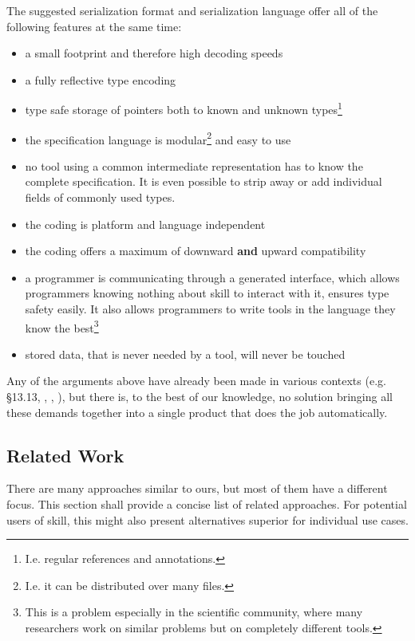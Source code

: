 The suggested serialization format and serialization language offer all of the following features at the same time:
\begin{itemize}
 \item a small footprint and therefore high decoding speeds
 \item a fully reflective type encoding
 \item type safe storage of pointers both to known and unknown types\footnote{I.e. regular references and annotations.}
 \item the specification language is modular\footnote{I.e. it can be distributed over many files.} and easy to use
 \item no tool using a common intermediate representation has to know the complete specification. It is even possible to strip away or add individual fields of commonly used types.
 \item the coding is platform and language independent
 \item the coding offers a maximum of downward \textbf{and} upward compatibility
 \item a programmer is communicating through a generated interface, which allows programmers knowing nothing about skill to interact with it, ensures type safety easily. It also allows programmers to write tools in the language they know the best\footnote{This is a problem especially in the scientific community, where many researchers work on similar problems but on completely different tools.}
 \item stored data, that is never needed by a tool, will never be touched
\end{itemize}

Any of the arguments above have already been made in various contexts (e.g. \cite{ada05} §13.13, \cite{llvm}, \cite{xml11}, \cite{lamb87}), but there is, to the best of our knowledge, no solution bringing all these demands together into a single product that does the job automatically.


\subsection{Related Work}

There are many approaches similar to ours, but most of them have a different focus. This section shall provide a concise list of related approaches. For potential users of \gls{skill}, this might also present alternatives superior for individual use cases.

